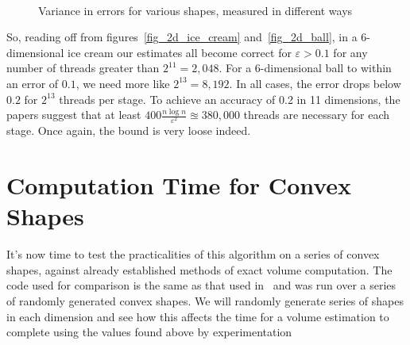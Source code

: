 \begin{figure}
\centering
{}
\\

\caption{Variance in errors for various shapes, measured in different ways}
\label{fig_histograms}
\end{figure}

So, reading off from figures~\ref{fig_2d_ice_cream} and~\ref{fig_2d_ball}, in a 6-dimensional ice cream our estimates all become correct for $\varepsilon > 0.1$ for any number of threads greater than $2^11 = 2,048$. For a 6-dimensional ball to within an error of $0.1$, we need more like $2^{13} = 8,192$. In all cases, the error drops below $0.2$ for $2^{13}$ threads per stage. To achieve an accuracy of 0.2 in 11 dimensions, the papers suggest that at least $400\frac{n\log n}{\varepsilon^2} \approxeq 380,000$ threads are necessary for each stage. Once again, the bound is very loose indeed.

\section{Computation Time for Convex Shapes}\label{sec_time}

It's now time to test the practicalities of this algorithm on a series of convex shapes, against already established methods of exact volume computation. The code used for comparison is the same as that used in~\cite{Bueler98}
and was run over a series of randomly generated convex shapes. We will randomly generate series of shapes in each dimension and see how this affects the time for a volume estimation to complete using the values found above by experimentation


